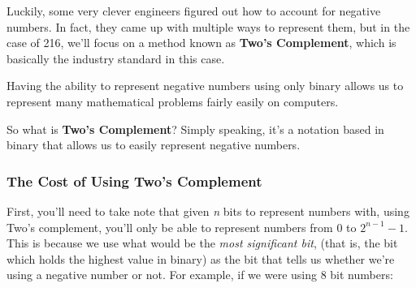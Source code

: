 \documentclass[english, 10pt]{article}
\begin{document}
Luckily, some very clever engineers figured out how to account for negative numbers. In fact, they came up with multiple ways to represent them, but in the case of 216, we'll focus on a method known as \textbf{Two's Complement}, which is basically the industry standard in this case.\newline

Having the ability to represent negative numbers using only binary allows us to represent many mathematical problems fairly easily on computers.\newline

So what is \textbf{Two's Complement}? Simply speaking, it's a notation based in binary that allows us to easily represent negative numbers.\newline

\subsubsection{The Cost of Using Two's Complement}

First, you'll need to take note that given \textit{n} bits to represent numbers with, using Two's complement, you'll only be able to represent numbers from $0$ to $2^{n-1}-1$. This is because we use what would be the \textit{most significant bit}, (that is, the bit which holds the highest value in binary) as the bit that tells us whether we're using a negative number or not. For example, if we were using 8 bit numbers:\newline
\end{document}
